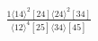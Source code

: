\documentclass[varwidth, border=5pt]{standalone}
\begin{document}
\begin{my}
$\begin{gathered}
\scriptscriptstyle\frac{1⟨14⟩^2[24]⟨24⟩^2[34]}{⟨12⟩^4[25]⟨34⟩[45]}
\end{gathered}$
\end{my}
\end{document}
